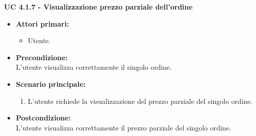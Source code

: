 \vspace{0.4cm}

\noindent \textbf{\large UC 4.1.7 - Visualizzazione prezzo parziale dell'ordine}
\label{uc:visualizzazione-prezzo-parziale-ord}
\begin{itemize}

	\item \textbf{Attori primari: }
		\begin{itemize}
			\item Utente.
		\end{itemize}

	\item \textbf{Precondizione: }\\[0.3cm]
		L'utente visualizza correttamente il singolo ordine.

	\item \textbf{Scenario principale: }
		\begin{enumerate}
			\item L'utente richiede la visualizzazione del prezzo parziale del singolo ordine.
		\end{enumerate}
		

	\item \textbf{Postcondizione: }\\[0.3cm]
		L'utente visualizza correttamente il prezzo parziale del singolo ordine.

\end{itemize}

\vspace{0.4cm}

